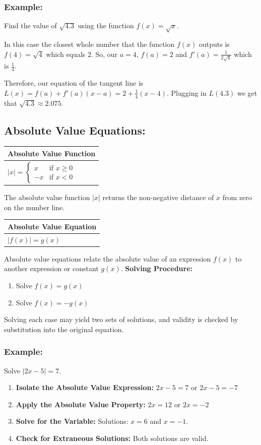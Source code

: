 \documentclass[12pt]{article}
\newcommand{\formula}[2]{
    {\renewcommand{\arraystretch}{2}
        \begin{center}
        \begin{tabular}{|p{0.9\textwidth}|}
        \hline
        \textbf{#1} \\
        \hline
        #2 \\
        \hline
        \end{tabular}
        \end{center}
    }
}
\begin{document}
\subsubsection{Example: }
Find the value of $\sqrt{4.3}$ using the function $f(x)=\sqrt{x}$.

\vspace{\baselineskip}
In this case the closest whole number that the function $f(x)$ outputs is $f(4) = \sqrt{4}$ which equals $2$. So, our $a = 4$, $f(a)=2$ and $f'(a)= \frac{1}{2\sqrt{4}}$ which is $\frac{1}{4}$.

\vspace{\baselineskip}
Therefore, our equation of the tangent line is $L(x) = f(a) + f'(a)(x - a) = 2 + \frac{1}{4} (x-4)$. Plugging in $L(4.3)$ we get that $\sqrt{4.3} \approx 2.075$.

\subsection{Absolute Value Equations: }
\formula{Absolute Value Function}{$|x| = \begin{cases} x & \text{if } x \geq 0 \\ -x & \text{if } x < 0 \end{cases}$}
The absolute value function $|x|$ returns the non-negative distance of $x$ from zero on the number line.
\formula{Absolute Value Equation}{$|f(x)| = g(x)$}
Absolute value equations relate the absolute value of an expression $f(x)$ to another expression or constant $g(x)$.
\textbf{Solving Procedure:}
\begin{enumerate}
    \item Solve \(f(x) = g(x)\)
    \item Solve \(f(x) = -g(x)\)
\end{enumerate}
Solving each case may yield two sets of solutions, and validity is checked by substitution into the original equation.

\subsubsection{Example: }
Solve $|2x - 5| = 7$.
\begin{enumerate}
    \item \textbf{Isolate the Absolute Value Expression:}
    $2x - 5 = 7$ or $2x - 5 = -7$
    \item \textbf{Apply the Absolute Value Property:}
    $2x = 12$ or $2x = -2$
    \item \textbf{Solve for the Variable:}
    Solutions: $x = 6$ and $x = -1$.
    \item \textbf{Check for Extraneous Solutions:}
    Both solutions are valid.
\end{enumerate}
\end{document}
